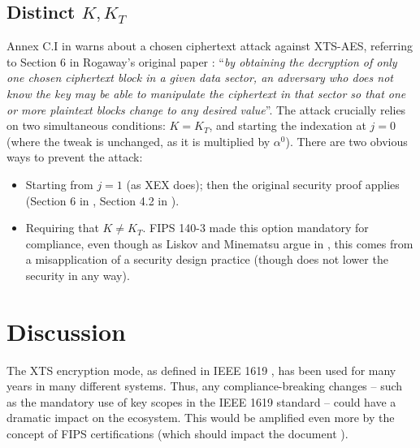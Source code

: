 \documentclass[a4paper]{article}
\begin{document}
\subsection{Distinct \texorpdfstring{$K, K_T$}{K, KT}}
Annex C.I in \cite{fips-140-3} warns about a chosen ciphertext attack against XTS-AES, referring to Section 6 in Rogaway's original paper \cite{rogaway2004efficient}: ``\emph{by
obtaining the decryption of only one chosen ciphertext block in a given data sector, an adversary who does not
know the key may be able to manipulate the ciphertext in that sector so that one or more plaintext blocks
change to any desired value}''. The attack crucially relies on two simultaneous conditions: $K=K_T$,
and starting the indexation at $j=0$ (where the tweak is unchanged, as it is multiplied by $\alpha^0$).
There are two obvious ways to prevent the attack:
\begin{itemize}
    \item Starting from $j=1$ (as XEX does); then the original security proof applies (Section 6 in \cite{rogaway2004efficient}, Section 4.2 in \cite{minematsu2006improved}).
    \item Requiring that $K \ne K_T$. FIPS 140-3 \cite{fips-140-3} made this option mandatory for compliance, even though as Liskov and Minematsu argue in \cite{liskov2008comments}, this comes from a misapplication of a security design practice (though does not lower the security in any way).
\end{itemize}

\section{Discussion} \label{sec:discussion}
The XTS encryption mode, as defined in IEEE 1619 \cite{IEEE1619-2018}, has been used for many years in many different systems. Thus, any compliance-breaking changes -- such as the mandatory use of key scopes in the IEEE 1619 standard \cite{IEEE1619-2025} -- could have a dramatic impact on the ecosystem. This would be amplified even more by the concept of FIPS certifications (which should impact the document \cite{fips-140-3}).
\end{document}

